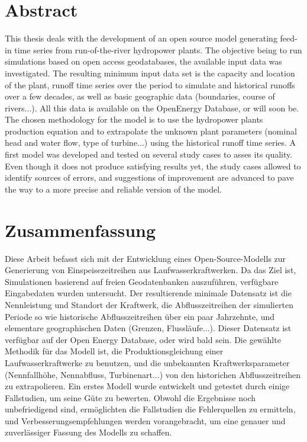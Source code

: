 \chapter*{Abstract}
\label{chap:abstract}

This thesis deals with the development of an open source model generating feed-in time series from run-of-the-river hydropower plants. The objective being to run simulations based on open access geodatabases, the available input data was investigated. The resulting minimum input data set is the capacity and location of the plant, runoff time series over the period to simulate and historical runoffs over a few decades, as well as basic geographic data (boundaries, course of rivers...). All this data is available on the OpenEnergy Database, or will soon be. The chosen methodology for the model is to use the hydropower plants production equation and to extrapolate the unknown plant parameters (nominal head and water flow, type of turbine...) using the historical runoff time series. A first model was developed and tested on several study cases to asses its quality. Even though it does not produce satisfying results yet, the study cases allowed to identify sources of errors, and suggestions of improvement are advanced to pave the way to a more precise and reliable version of the model.


\chapter*{Zusammenfassung}

Diese Arbeit befasst sich mit der Entwicklung eines Open-Source-Modells zur Generierung von Einspeisezeitreihen aus Laufwasserkraftwerken. Da das Ziel ist, Simulationen basierend auf freien Geodatenbanken auszuführen, verfügbare Eingabedaten wurden untersucht. Der resultierende minimale Datensatz ist die Nennleistung und Standort der Kraftwerk, die Abflusszeitreihen der simulierten Periode so wie historische Abflusszeitreihen über ein paar Jahrzehnte, und elementare geographischen Daten (Grenzen, Flussläufe...). Dieser Datensatz ist verfügbar auf der Open Energy Database, oder wird bald sein. Die gewählte Methodik für das Modell ist, die Produktionsgleichung einer Laufwasserkraftwerke zu benutzen, und die unbekannten Kraftwerksparameter (Nennfallhöhe, Nennabfluss, Turbinenart...) von den historichen Abflusszeitreihen zu extrapolieren. Ein erstes Modell wurde entwickelt und getestet durch einige Fallstudien, um seine Güte zu bewerten. Obwohl die Ergebnisse noch unbefriedigend sind, ermöglichten die Fallstudien die Fehlerquellen zu ermitteln, und Verbesserungsempfehlungen werden vorangebracht, um eine genauer und zuverlässiger Fassung des Modells zu schaffen.


